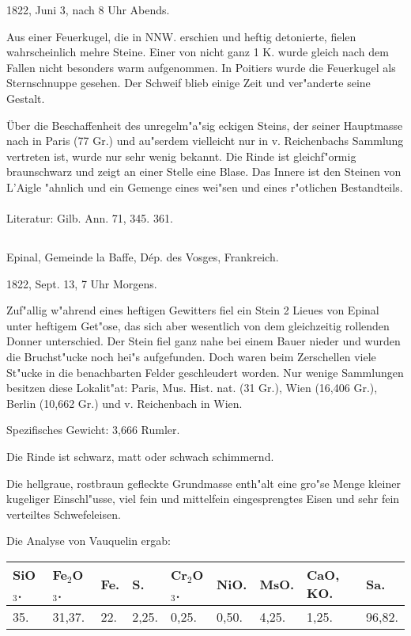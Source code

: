 \documentclass[a4paper, 11pt, oneside]{article}
\begin{document}
1822, Juni 3, nach 8 Uhr Abends.

Aus einer Feuerkugel, die in NNW. erschien und heftig detonierte, fielen wahrscheinlich mehre Steine. Einer von nicht ganz 1 K. wurde gleich nach dem Fallen nicht besonders warm aufgenommen. In Poitiers wurde die Feuerkugel als Sternschnuppe gesehen. Der Schweif blieb einige Zeit und ver"anderte seine Gestalt.

Über die Beschaffenheit des unregelm"a"sig eckigen Steins, der seiner Hauptmasse nach in Paris (77 Gr.) und au"serdem vielleicht nur in v. Reichenbachs Sammlung vertreten ist, wurde nur sehr wenig bekannt. Die Rinde ist gleichf"ormig braunschwarz und zeigt an einer Stelle eine Blase. Das Innere ist den Steinen von L'Aigle "ahnlich und ein Gemenge eines wei"sen und eines r"otlichen Bestandteils.
\normalsize
\paragraph{}
Literatur: Gilb. Ann. 71, 345. 361.
\subsection{}
\LARGE
\paragraph{}
Epinal, Gemeinde la Baffe, Dép. des Vosges, Frankreich.

1822, Sept. 13, 7 Uhr Morgens.

Zuf"allig w"ahrend eines heftigen Gewitters fiel ein Stein 2 Lieues von Epinal unter heftigem Get"ose, das sich aber wesentlich von dem gleichzeitig rollenden Donner unterschied. Der Stein fiel ganz nahe bei einem Bauer nieder und wurden die Bruchst"ucke noch hei"s aufgefunden. Doch waren beim Zerschellen viele St"ucke in die benachbarten Felder geschleudert worden. Nur wenige Sammlungen besitzen diese Lokalit"at: Paris, Mus. Hist. nat. (31 Gr.), Wien (16,406 Gr.), Berlin (10,662 Gr.) und v. Reichenbach in Wien.

Spezifisches Gewicht: 3,666 Rumler.

Die Rinde ist schwarz, matt oder schwach schimmernd.

Die hellgraue, rostbraun gefleckte Grundmasse enth"alt eine gro"se Menge kleiner kugeliger Einschl"usse, viel fein und mittelfein eingesprengtes Eisen und sehr fein verteiltes Schwefeleisen.

Die Analyse von Vauquelin ergab:
\begin{table}[!ht]
    \centering\swabfamily\Large
    \normalsize
    \begin{tabular}{l l l l l l l l l}
        SiO$_{3}$. & Fe$_{2}$O$_{3}$. & Fe. & S. & Cr$_{2}$O$_{3}$. & NiO. & MsO. & CaO, KO. & Sa. \\ \hline
        35. & 31,37. & 22. & 2,25. & 0,25. & 0,50. & 4,25. & 1,25. & 96,82. \\
    \end{tabular}
\end{table}
\end{document}
